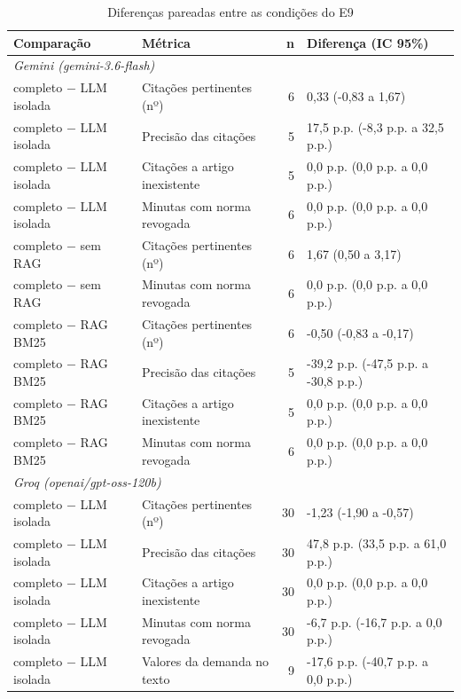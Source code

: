 \begin{table}[htbp]
\caption{Diferenças pareadas entre as condições do E9}\label{tab:llm-pareado}
\centering\footnotesize
\setlength{\tabcolsep}{4pt}
\begin{tabular}{llrl}
\toprule
Comparação & Métrica & n & Diferença (IC 95\%) \\
\midrule
\multicolumn{4}{l}{\textit{Gemini (gemini-3.6-flash)}} \\
\quad completo $-$ LLM isolada & Citações pertinentes (nº) & 6 & 0,33 (-0,83 a 1,67) \\
\quad completo $-$ LLM isolada & Precisão das citações & 5 & 17,5 p.p. (-8,3 p.p. a 32,5 p.p.) \\
\quad completo $-$ LLM isolada & Citações a artigo inexistente & 5 & 0,0 p.p. (0,0 p.p. a 0,0 p.p.) \\
\quad completo $-$ LLM isolada & Minutas com norma revogada & 6 & 0,0 p.p. (0,0 p.p. a 0,0 p.p.) \\
\quad completo $-$ sem RAG & Citações pertinentes (nº) & 6 & 1,67 (0,50 a 3,17) \\
\quad completo $-$ sem RAG & Minutas com norma revogada & 6 & 0,0 p.p. (0,0 p.p. a 0,0 p.p.) \\
\quad completo $-$ RAG BM25 & Citações pertinentes (nº) & 6 & -0,50 (-0,83 a -0,17) \\
\quad completo $-$ RAG BM25 & Precisão das citações & 5 & -39,2 p.p. (-47,5 p.p. a -30,8 p.p.) \\
\quad completo $-$ RAG BM25 & Citações a artigo inexistente & 5 & 0,0 p.p. (0,0 p.p. a 0,0 p.p.) \\
\quad completo $-$ RAG BM25 & Minutas com norma revogada & 6 & 0,0 p.p. (0,0 p.p. a 0,0 p.p.) \\
\multicolumn{4}{l}{\textit{Groq (openai/gpt-oss-120b)}} \\
\quad completo $-$ LLM isolada & Citações pertinentes (nº) & 30 & -1,23 (-1,90 a -0,57) \\
\quad completo $-$ LLM isolada & Precisão das citações & 30 & 47,8 p.p. (33,5 p.p. a 61,0 p.p.) \\
\quad completo $-$ LLM isolada & Citações a artigo inexistente & 30 & 0,0 p.p. (0,0 p.p. a 0,0 p.p.) \\
\quad completo $-$ LLM isolada & Minutas com norma revogada & 30 & -6,7 p.p. (-16,7 p.p. a 0,0 p.p.) \\
\quad completo $-$ LLM isolada & Valores da demanda no texto & 9 & -17,6 p.p. (-40,7 p.p. a 0,0 p.p.) \\

\end{tabular}
\end{table}
